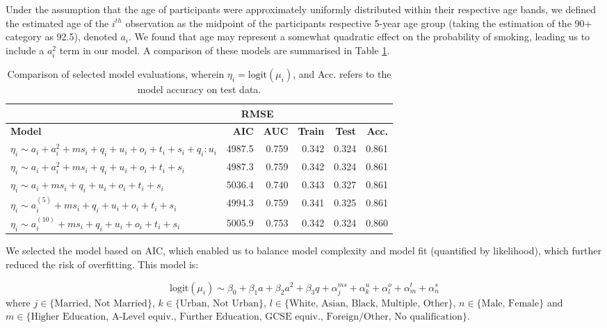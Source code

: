 \documentclass[
  11pt,
  twocolumn]{article}
\begin{document}
Under the assumption that the age of participants were approximately
uniformly distributed within their respective age bands, we defined the
estimated age of the \(i^{th}\) observation as the midpoint of the
participants respective 5-year age group (taking the estimation of the
90+ category as 92.5), denoted \(a_i\). We found that age may represent
a somewhat quadratic effect on the probability of smoking, leading us to
include a \(a_i^2\) term in our model. A comparison of these models are
summarised in Table \ref{tab:output-model-selection-table}.

\begin{table}
\centering
\caption{\label{tab:outputmodelselectiontable}Comparison of selected model evaluations, wherein $\eta_i = \text{logit}(\mu_i)$, and Acc. refers to the model accuracy on test data.\label{tab:output-model-selection-table}}
\centering
\fontsize{9}{11}\selectfont
\begin{tabular}[t]{>{\raggedright\arraybackslash}p{7em}|r|r|r|r|r}
\hline
\multicolumn{3}{c|}{ } & \multicolumn{2}{c|}{RMSE} & \multicolumn{1}{c}{ } \\
\cline{4-5}
\textbf{Model} & \textbf{AIC} & \textbf{AUC} & \textbf{Train} & \textbf{Test} & \textbf{Acc.}\\
\hline
$\eta_i \sim a_i + a_i^2 + ms_i + q_i + u_i + o_i + t_i + s_i + q_i:u_i$ & 4987.5 & 0.759 & 0.342 & 0.324 & 0.861\\
\hline
$\eta_i \sim a_i + a_i^2 + ms_i + q_i + u_i + o_i + t_i + s_i$ & 4987.3 & 0.759 & 0.342 & 0.324 & 0.861\\
\hline
$\eta_i \sim a_i + ms_i + q_i + u_i + o_i + t_i + s_i$ & 5036.4 & 0.740 & 0.343 & 0.327 & 0.861\\
\hline
$\eta_i \sim a_i^{(5)} + ms_i + q_i + u_i + o_i + t_i + s_i$ & 4994.3 & 0.759 & 0.341 & 0.325 & 0.861\\
\hline
$\eta_i \sim a_i^{(10)} + ms_i + q_i + u_i + o_i + t_i + s_i$ & 5005.9 & 0.753 & 0.342 & 0.324 & 0.860\\
\hline
\end{tabular}
\end{table}

We selected the model based on AIC, which enabled us to balance model
complexity and model fit (quantified by likelihood), which further
reduced the risk of overfitting. This model is:

\[\text{logit}(\mu_i) \sim \beta_0 + \beta_1a + \beta_2a^2 + \beta_3q + \alpha^{ms}_j + \alpha^{u}_k + \alpha^{o}_l + \alpha^{t}_m + \alpha^{s}_n\]
where \(j \in \{\text{Married, Not Married}\}\),
\(k \in \{\text{Urban, Not Urban}\}\),
\(l \in \{\text{White, Asian, Black, Multiple, Other}\}\),
\(n \in \{\text{Male, Female}\}\) and
\(m \in \{\text{Higher Education, A-Level equiv., Further Education, GCSE equiv., Foreign/Other, No qualification}\}\).
\end{document}
